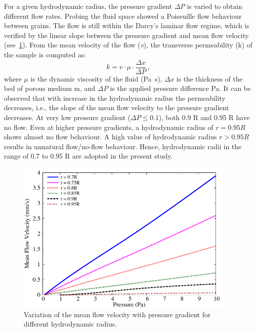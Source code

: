 For a given hydrodynamic radius, the 
pressure gradient $\Delta P$ is varied to obtain different flow rates. Probing 
the fluid space showed a Poiseuille flow behaviour between grains. The flow is 
still within the Darcy's laminar flow regime, which is verified by the linear 
slope between the pressure gradient and mean flow velocity 
(see~\cref{fig:permeability}). From the mean velocity of the flow (\textit{v}), 
the transverse permeability (k) of the sample is computed as:
%
\begin{equation}
k=v\cdot\mu\cdot\frac{\Delta x}{\Delta P} \,,
\end{equation}
%
where $\mu$ is the dynamic viscosity of the fluid (\si{\Pa\s}), $\Delta x$ is 
the thickness of the bed of porous medium \si{\m}, and $\Delta P$ is the 
applied pressure difference \si{\Pa}. It can be observed that with increase in 
the hydrodynamic radius the permeability decreases, i.e., the slope of the mean 
flow velocity to the pressure gradient decreases. At very low pressure gradient 
($\Delta P \le 0.1$), both 0.9 R and 0.95 R have no flow. Even at 
higher pressure gradients, a hydrodynamic radius of $r = 0.95R$ shows almost no 
flow behaviour. A high value of hydrodynamic radius $r > 0.95R$ 
results in unnatural flow/no-flow behaviour. Hence, hydrodynamic radii in the 
range of 0.7 to 0.95 R are adopted in the present study.

\begin{figure}[htpb]
\centering
\includegraphics[width=0.95\textwidth]{Permeability}
\caption{Variation of the mean flow velocity with pressure gradient for 
different hydrodynamic radius.}
\label{fig:permeability}
\end{figure}



